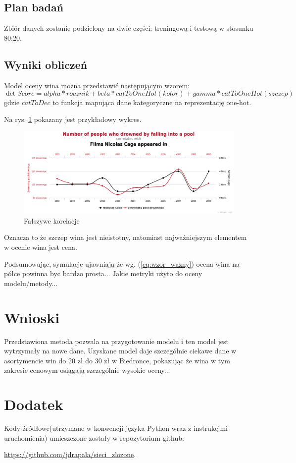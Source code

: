 \documentclass[10pt]{article}
\begin{document}
\subsection{Plan badań}
Zbiór danych zostanie podzielony na dwie części: treningową i testową w stosunku 80:20. 


\subsection{Wyniki obliczeń} 
Model oceny wina można przedstawić następującym wzorem:
\begin{equation}
\det Score = alpha * rocznik + beta * catToOneHot(kolor) + gamma * catToOneHot(szczep) 
\label{eq:wzor_wazny}
\end{equation}
gdzie $catToDec$ to funkcja mapująca dane kategoryczne na reprezentację one-hot.

Na rys. \ref{fig:korelacje} pokazany jest przykładowy wykres. 
\begin{figure}[!hbt]
\begin{center}
\includegraphics[width=0.8\linewidth]{rys1.png}
\caption{Fałszywe korelacje}
\label{fig:korelacje}
\end{center}
\end{figure}

Oznacza to że szczep wina jest nieistotny, natomiast najważniejszym elementem w ocenie wina jest cena.

Podsumowując, symulacje ujawniają że wg. (\ref{eq:wzor_wazny}) ocena wina na półce powinna byc bardzo prosta...
Jakie metryki użyto do oceny modelu/metody...

\section{Wnioski}
Przedstawiona metoda pozwala na przygotowanie modelu i ten model jest wytrzymały na nowe dane. Uzyskane model daje szczególnie ciekawe dane w asortymencie win do 20 zł do 30 zł w Biedronce, pokazując że wina w tym zakresie cenowym osiągają szczególnie wysokie oceny...

\appendix
\section{Dodatek}
Kody źródłowe(utrzymane w konwencji języka Python wraz z instrukcjmi uruchomienia) umieszczone zostały w repozytorium github:

\noindent \url{https://github.com/jdrapala/sieci_zlozone}.
\end{document}
